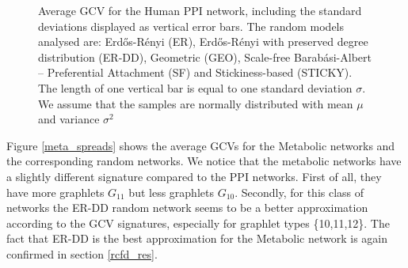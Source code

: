 \begin{figure}[H]
\begin{subfigure}[b]{1.0\textwidth}
  \end{subfigure}
\caption[Average GCV for the Human PPI network and ER, ER-DD, GEO, SF and STICKY random models]{Average GCV for the Human PPI network, including the standard deviations displayed as vertical error bars. The random models analysed are: Erd\H{o}s-R\'{e}nyi (ER), Erd\H{o}s-R\'{e}nyi with preserved degree distribution (ER-DD), Geometric (GEO), Scale-free Barab\'{a}si-Albert -- Preferential Attachment (SF) and 
Stickiness-based (STICKY). The length of one vertical bar is equal to one standard deviation $\sigma$. We assume that the samples are normally distributed with mean $\mu$ and variance $\sigma^2$}
\label{ppi_spreads}
\end{figure}

Figure \ref{meta_spreads} shows the average GCVs for the Metabolic networks and the corresponding random networks. We notice that the metabolic networks have a slightly different signature compared to the PPI networks. First of all, they have more graphlets $G_{11}$ but less graphlets $G_{10}$. Secondly, for this class of networks the ER-DD random network seems to be a better approximation according to the GCV signatures, especially for graphlet types \{10,11,12\}. The fact that ER-DD is the best approximation for the Metabolic network is again confirmed in section \ref{rcfd_res}.

